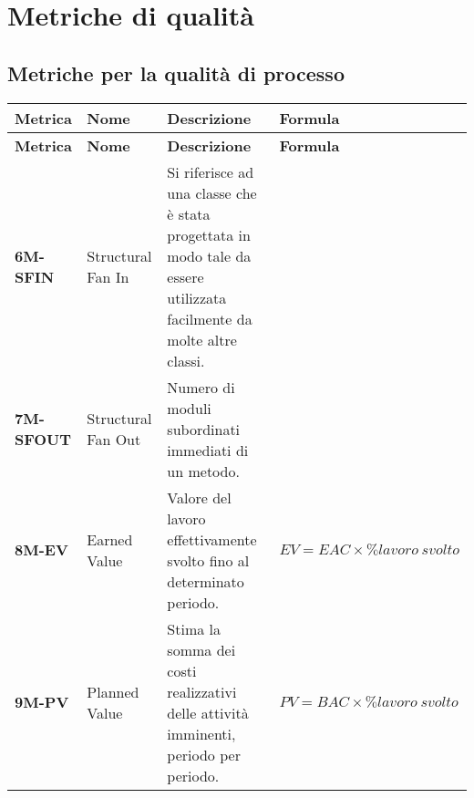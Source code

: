 \section{Metriche di qualità}
\subsection{Metriche per la qualità di processo}
\begin{longtable}{|>{\centering\arraybackslash}p{}|>{\centering\arraybackslash}p{}|>{\centering\arraybackslash}p{}|>{\centering\arraybackslash}p{}|}
	\hline
	\textbf{Metrica}  & \textbf{Nome}                & \textbf{Descrizione}                                                                                                           & \textbf{Formula}                                                                                              \\
	\hline
	\endfirsthead
	\hline
	\textbf{Metrica}  & \textbf{Nome}                & \textbf{Descrizione}                                                                                                           & \textbf{Formula}                                                                                              \\
	\endhead
	\textbf{6M-SFIN}  & Structural Fan In            & Si riferisce ad una classe che è stata progettata in modo tale da essere utilizzata facilmente da molte altre classi.          &                                                                                                               \\
	\hline
	\textbf{7M-SFOUT} & Structural Fan Out           & Numero di moduli subordinati immediati di un metodo.                                                                           &                                                                                                               \\
	\hline
	\textbf{8M-EV}    & Earned Value                 & Valore del lavoro effettivamente svolto fino al determinato periodo.                                                           & $EV = EAC \times \%lavoro\:svolto$                                                                            \\
	\hline
	\textbf{9M-PV}    & Planned Value                & Stima la somma dei costi realizzativi delle attività imminenti, periodo per periodo.                                           & $PV = BAC \times \%lavoro\:svolto$                                                                            \\

\end{longtable}
